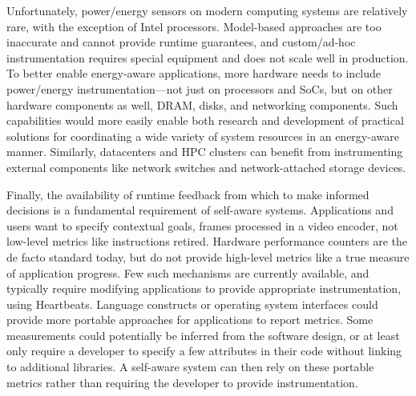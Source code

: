 Unfortunately, power/energy sensors on modern computing systems are relatively rare, with the exception of Intel processors.
Model-based approaches are too inaccurate and cannot provide runtime guarantees, and custom/ad-hoc instrumentation requires special equipment and does not scale well in production.
To better enable energy-aware applications, more hardware needs to include power/energy instrumentation---not just on processors and SoCs, but on other hardware components as well, \eg DRAM, disks, and networking components.
Such capabilities would more easily enable both research and development of practical solutions for coordinating a wide variety of system resources in an energy-aware manner.
Similarly, datacenters and HPC clusters can benefit from instrumenting external components like network switches and network-attached storage devices.

Finally, the availability of runtime feedback from which to make informed decisions is a fundamental requirement of self-aware systems.
Applications and users want to specify contextual goals, \eg frames processed in a video encoder, not low-level metrics like instructions retired.
Hardware performance counters are the de facto standard today, but do not provide high-level metrics like a true measure of application progress.
Few such mechanisms are currently available, and typically require modifying applications to provide appropriate instrumentation, \eg using Heartbeats.
Language constructs or operating system interfaces could provide more portable approaches for applications to report metrics.
Some measurements could potentially be inferred from the software design, or at least only require a developer to specify a few attributes in their code without linking to additional libraries.
A self-aware system can then rely on these portable metrics rather than requiring the developer to provide instrumentation.
